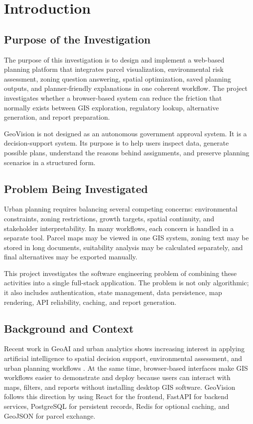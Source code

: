 \documentclass[12pt,a4paper,oneside]{report}
\begin{document}
\tableofcontents
\listoffigures
\listoftables
\clearpage
{}

\chapter{Introduction}
\section{Purpose of the Investigation}
The purpose of this investigation is to design and implement a web-based planning platform that integrates parcel visualization, environmental risk assessment, zoning question answering, spatial optimization, saved planning outputs, and planner-friendly explanations in one coherent workflow. The project investigates whether a browser-based system can reduce the friction that normally exists between GIS exploration, regulatory lookup, alternative generation, and report preparation.

GeoVision is not designed as an autonomous government approval system. It is a decision-support system. Its purpose is to help users inspect data, generate possible plans, understand the reasons behind assignments, and preserve planning scenarios in a structured form.

\section{Problem Being Investigated}
Urban planning requires balancing several competing concerns: environmental constraints, zoning restrictions, growth targets, spatial continuity, and stakeholder interpretability. In many workflows, each concern is handled in a separate tool. Parcel maps may be viewed in one GIS system, zoning text may be stored in long documents, suitability analysis may be calculated separately, and final alternatives may be exported manually.

This project investigates the software engineering problem of combining these activities into a single full-stack application. The problem is not only algorithmic; it also includes authentication, state management, data persistence, map rendering, API reliability, caching, and report generation.

\section{Background and Context}
Recent work in GeoAI and urban analytics shows increasing interest in applying artificial intelligence to spatial decision support, environmental assessment, and urban planning workflows \cite{mai2025geoai}. At the same time, browser-based interfaces make GIS workflows easier to demonstrate and deploy because users can interact with maps, filters, and reports without installing desktop GIS software. GeoVision follows this direction by using React for the frontend, FastAPI for backend services, PostgreSQL for persistent records, Redis for optional caching, and GeoJSON for parcel exchange.
\end{document}
